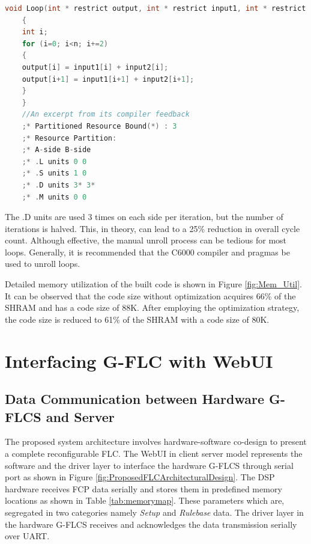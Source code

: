 \begin{description}
\begin{lstlisting}[language=C,caption={Manually Unrolled Loop},label=CS:constraints]
	void Loop(int * restrict output, int * restrict input1, int * restrict input2, int n)
	{
	int i;
	for (i=0; i<n; i+=2)
	{
	output[i] = input1[i] + input2[i];
	output[i+1] = input1[i+1] + input2[i+1];
	}
	}
	//An excerpt from its compiler feedback
	;* Partitioned Resource Bound(*) : 3
	;* Resource Partition:
	;* A-side B-side
	;* .L units 0 0
	;* .S units 1 0
	;* .D units 3* 3*
	;* .M units 0 0		
	\end{lstlisting}
	The .D units are used 3 times on each side per iteration, but the number of iterations is halved. This, in theory, can lead to a 25\% reduction in overall cycle count. Although effective, the manual unroll process can be tedious for most loops. Generally, it is recommended that the C6000 compiler and pragmas be used to unroll loops.
\end{description}

Detailed memory utilization of the built code is shown in Figure \ref{fig:Mem_Util}. It can be observed that the code size without optimization acquires 66\% of the SHRAM and has a code size of 88K. After employing the optimization strategy, the code size is reduced to 61\% of the SHRAM with a code size of 80K.

\section{Interfacing G\hyp{}FLC with WebUI}
\subsection{Data Communication between Hardware G\hyp{}FLCS and Server}
The proposed system architecture involves hardware\hyp{}software co\hyp{}design to present a complete reconfigurable FLC. The WebUI in client server model represents the software and the driver layer to interface the hardware G\hyp{}FLCS through serial port as shown in Figure \ref{fig:ProposedFLCArchitecturalDesign}. The DSP hardware receives FCP data serially and stores them in predefined memory locations as shown in Table \ref{tab:memorymap}. These parameters which are, segregated in two categories namely \textit{Setup} and \textit{Rulebase} data. The driver layer in the hardware G\hyp{}FLCS receives and acknowledges the data transmission serially over UART. 


